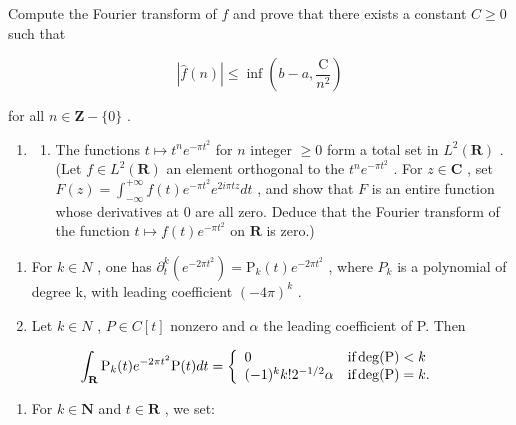 Compute the Fourier transform of \(f\) and prove that there exists a constant \(C \geqslant 0\) such that

\[
| \widehat {f} (n) | \leqslant \inf \left(b - a, \frac {\mathrm{C}}{n ^ {2}}\right)
\]

for all \(n \in \mathbf{Z} - \{0\}\) .

\begin{enumerate}
\def\labelenumi{\arabic{enumi})}
\setcounter{enumi}{2}
\tightlist
\item
  \begin{enumerate}
  \def\labelenumii{\alph{enumii})}
  \tightlist
  \item
    The functions \(t \mapsto t^n e^{-\pi t^2}\) for \(n\) integer \(\geqslant 0\) form a total set in \(L^2(\mathbf{R})\) . (Let \(f \in L^2(\mathbf{R})\) an element orthogonal to the \(t^n e^{-\pi t^2}\) . For \(z \in \mathbf{C}\) , set \(F(z) = \int_{-\infty}^{+\infty} f(t)e^{-\pi t^2}e^{2i\pi tz}dt\) , and show that \(F\) is an entire function whose derivatives at 0 are all zero. Deduce that the Fourier transform of the function \(t \mapsto f(t)e^{-\pi t^2}\) on \(\mathbf{R}\) is zero.)
  \end{enumerate}
\end{enumerate}

\begin{enumerate}
\def\labelenumi{\alph{enumi})}
\setcounter{enumi}{1}
\item
  For \(k \in N\) , one has \(\partial_{t}^{k}(e^{-2\pi t^{2}}) = \mathrm{P}_{k}(t)e^{-2\pi t^{2}}\) , where \(P_{k}\) is a polynomial of degree k, with leading coefficient \((-4\pi)^{k}\) .
\item
  Let \(k \in N\) , \(P \in C[t]\) nonzero and \(\alpha\) the leading coefficient of P. Then
\end{enumerate}

\[
\int_ {\mathbf {R}} \mathrm{P} _ {k} (t) e ^ {- 2 \pi t ^ {2}} \mathrm{P} (t)   d t = \left\{ \begin{array}{l l} 0 & \text {if} \deg (\mathrm{P}) <   k \\ (- 1) ^ {k} k! 2 ^ {- 1 / 2} \alpha & \text {if} \deg (\mathrm{P}) = k. \end{array} \right.
\]

\begin{enumerate}
\def\labelenumi{\alph{enumi})}
\setcounter{enumi}{3}
\tightlist
\item
  For \(k \in \mathbf{N}\) and \(t \in \mathbf{R}\) , we set:
\end{enumerate}

